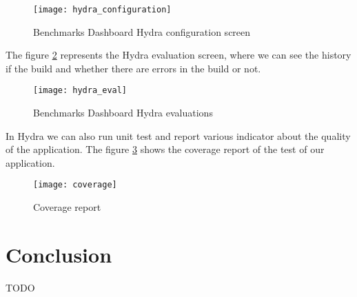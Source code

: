 \begin{figure}[h]
\texttt{[image: hydra\_configuration]}
\caption{Benchmarks Dashboard Hydra configuration screen}
\label{fig:hydra_configuration}
\end{figure}

The figure \hyperref[fig:hydra_eval]{\ref{fig:hydra_eval}} represents the Hydra
evaluation screen, where we can see the history if the build and whether there
are errors in the build or not.

\begin{figure}[h]
\texttt{[image: hydra\_eval]}
\caption{Benchmarks Dashboard Hydra evaluations}
\label{fig:hydra_eval}
\end{figure}

In Hydra we can also run unit test and report various indicator about the
quality of the application. The figure
\hyperref[fig:coverage]{\ref{fig:coverage}} shows the coverage report of the test
of our application.

\begin{figure}[h]
\texttt{[image: coverage]}
\caption{Coverage report}
\label{fig:coverage}
\end{figure}

\clearpage
\section*{Conclusion}
TODO
